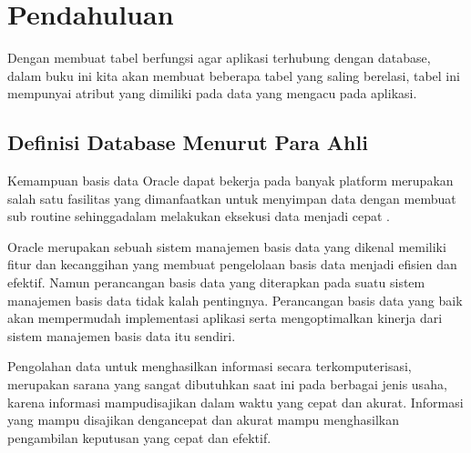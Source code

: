 \section{Pendahuluan}
Dengan membuat tabel berfungsi agar aplikasi terhubung dengan database, dalam buku ini kita akan membuat beberapa tabel yang saling berelasi, tabel ini mempunyai atribut yang dimiliki pada data yang mengacu pada aplikasi.

\subsection{Definisi Database Menurut Para Ahli}
Kemampuan basis data Oracle dapat bekerja pada banyak platform merupakan salah satu  fasilitas  yang dimanfaatkan untuk  menyimpan data dengan membuat sub routine sehinggadalam  melakukan eksekusi data menjadi  cepat \cite{pemanfaatandatabase2018}.

\par Oracle merupakan sebuah sistem manajemen basis data yang dikenal memiliki fitur dan kecanggihan yang membuat pengelolaan basis data menjadi efisien dan efektif. Namun perancangan basis data yang diterapkan pada suatu sistem manajemen basis data tidak kalah pentingnya. Perancangan basis data yang baik akan mempermudah implementasi aplikasi serta mengoptimalkan kinerja dari sistem manajemen basis data itu sendiri\cite{perancanganDB2013}.

\par Pengolahan data untuk menghasilkan informasi secara terkomputerisasi, merupakan sarana yang sangat dibutuhkan saat ini pada berbagai jenis usaha, karena informasi mampudisajikan dalam waktu yang cepat dan akurat. Informasi yang mampu disajikan dengancepat dan akurat mampu menghasilkan pengambilan keputusan yang cepat dan efektif\cite{jurnalDB2011}.

